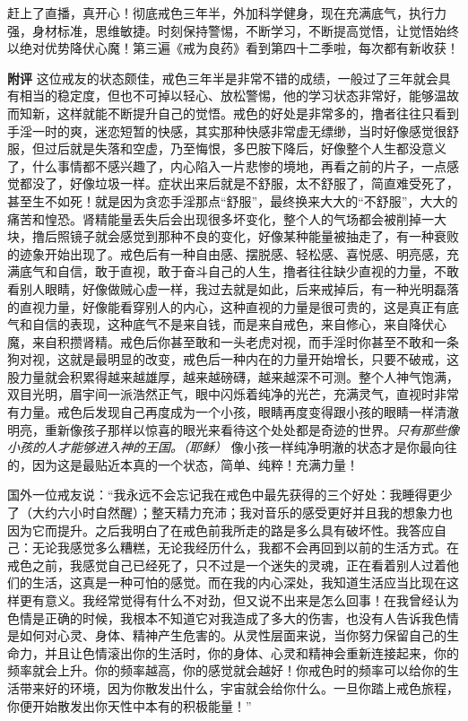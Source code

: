 \begin{case}
    赶上了直播，真开心！彻底戒色三年半，外加科学健身，现在充满底气，执行力强，身材标准，思维敏捷。时刻保持警惕，不断学习，不断提高觉悟，让觉悟始终以绝对优势降伏心魔！第三遍《戒为良药》看到第四十二季啦，每次都有新收获！

    \textbf{附评} 这位戒友的状态颇佳，戒色三年半是非常不错的成绩，一般过了三年就会具有相当的稳定度，但也不可掉以轻心、放松警惕，他的学习状态非常好，能够温故而知新，这样就能不断提升自己的觉悟。戒色的好处是非常多的，撸者往往只看到手淫一时的爽，迷恋短暂的快感，其实那种快感非常虚无缥缈，当时好像感觉很舒服，但过后就是失落和空虚，乃至悔恨，多巴胺下降后，好像整个人生都没意义了，什么事情都不感兴趣了，内心陷入一片悲惨的境地，再看之前的片子，一点感觉都没了，好像垃圾一样。症状出来后就是不舒服，太不舒服了，简直难受死了，甚至生不如死！就是因为贪恋手淫那点“舒服”，最终换来大大的“不舒服”，大大的痛苦和惶恐。肾精能量丢失后会出现很多坏变化，整个人的气场都会被削掉一大块，撸后照镜子就会感觉到那种不良的变化，好像某种能量被抽走了，有一种衰败的迹象开始出现了。戒色后有一种自由感、摆脱感、轻松感、喜悦感、明亮感，充满底气和自信，敢于直视，敢于奋斗自己的人生，撸者往往缺少直视的力量，不敢看别人眼睛，好像做贼心虚一样，我过去就是如此，后来戒掉后，有一种光明磊落的直视力量，好像能看穿别人的内心，这种直视的力量是很可贵的，这是真正有底气和自信的表现，这种底气不是来自钱，而是来自戒色，来自修心，来自降伏心魔，来自积攒肾精。戒色后你甚至敢和一头老虎对视，而手淫时你甚至不敢和一条狗对视，这就是最明显的改变，戒色后一种内在的力量开始增长，只要不破戒，这股力量就会积累得越来越雄厚，越来越磅礴，越来越深不可测。整个人神气饱满，双目光明，眉宇间一派浩然正气，眼中闪烁着纯净的光芒，充满灵气，直视时非常有力量。戒色后发现自己再度成为一个小孩，眼睛再度变得跟小孩的眼睛一样清澈明亮，重新像孩子那样以惊喜的眼光来看待这个处处都是奇迹的世界。\textit{只有那些像小孩的人才能够进入神的王国。（耶稣）} 像小孩一样纯净明澈的状态才是你最向往的，因为这是最贴近本真的一个状态，简单、纯粹！充满力量！

    国外一位戒友说：“我永远不会忘记我在戒色中最先获得的三个好处：我睡得更少了（大约六小时自然醒）；整天精力充沛；我对音乐的感受更好并且我的想象力也因为它而提升。之后我明白了在戒色前我所走的路是多么具有破坏性。我答应自己：无论我感觉多么糟糕，无论我经历什么，我都不会再回到以前的生活方式。在戒色之前，我感觉自己已经死了，只不过是一个迷失的灵魂，正在看着别人过着他们的生活，这真是一种可怕的感觉。而在我的内心深处，我知道生活应当比现在这样更有意义。我经常觉得有什么不对劲，但又说不出来是怎么回事！在我曾经认为色情是正确的时候，我根本不知道它对我造成了多大的伤害，也没有人告诉我色情是如何对心灵、身体、精神产生危害的。从灵性层面来说，当你努力保留自己的生命力，并且让色情滚出你的生活时，你的身体、心灵和精神会重新连接起来，你的频率就会上升。你的频率越高，你的感觉就会越好！你戒色时的频率可以给你的生活带来好的环境，因为你散发出什么，宇宙就会给你什么。一旦你踏上戒色旅程，你便开始散发出你天性中本有的积极能量！”


\end{case}
